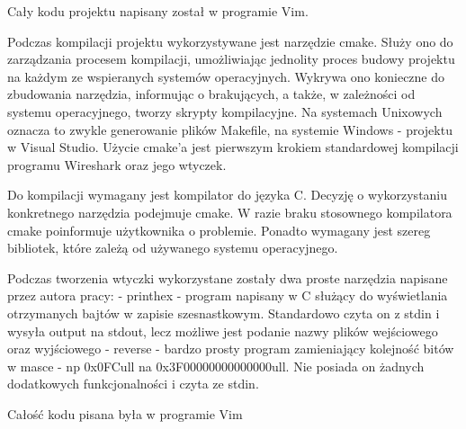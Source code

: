\documentclass[a4paper,12pt]{article}
\begin{document}
Cały kodu projektu napisany został w programie Vim.

Podczas kompilacji projektu wykorzystywane jest narzędzie cmake. Służy ono do zarządzania procesem kompilacji,
umożliwiając jednolity proces budowy projektu
na każdym ze wspieranych systemów operacyjnych. Wykrywa ono konieczne do zbudowania narzędzia, informując
o brakujących, a także, w zależności od systemu operacyjnego, tworzy skrypty kompilacyjne. Na systemach Unixowych
oznacza to zwykle generowanie plików Makefile, na systemie Windows - projektu w Visual Studio. Użycie cmake'a
jest pierwszym krokiem standardowej kompilacji programu Wireshark oraz jego wtyczek.

Do kompilacji wymagany jest kompilator do języka C. Decyzję o wykorzystaniu konkretnego narzędzia podejmuje cmake.
W razie braku stosownego kompilatora cmake poinformuje użytkownika o problemie. Ponadto wymagany jest szereg
bibliotek, które zależą od używanego systemu operacyjnego.

Podczas tworzenia wtyczki wykorzystane zostały dwa proste narzędzia napisane przez autora pracy:
- printhex - program napisany w C służący do wyświetlania otrzymanych bajtów w zapisie szesnastkowym. Standardowo
czyta on z stdin i wysyła output na stdout, lecz możliwe jest podanie nazwy plików wejściowego oraz wyjściowego
- reverse - bardzo prosty program zamieniający kolejność bitów w masce - np 0x0FCull na 0x3F00000000000000ull.
Nie posiada on żadnych dodatkowych funkcjonalności i czyta ze stdin.





Całość kodu pisana była w programie Vim





\vspace{85mm}
\end{document}
